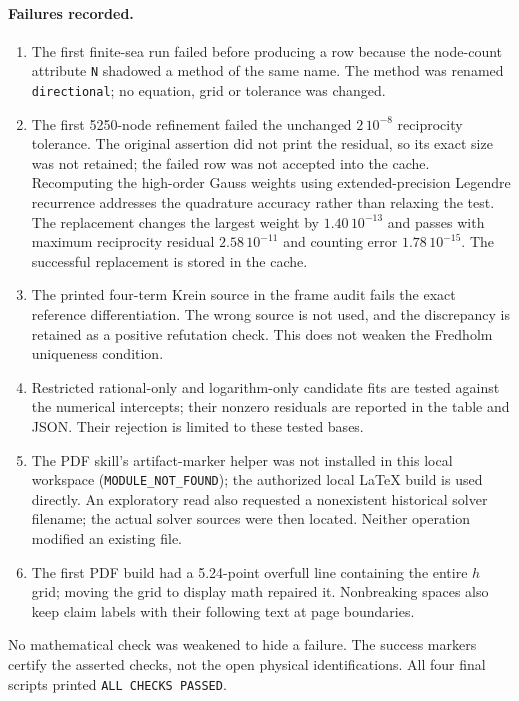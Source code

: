 \documentclass[11pt,a4paper]{article}
\begin{document}
\paragraph{Failures recorded.}
\begin{enumerate}
\item The first finite-sea run failed before producing a row because the
node-count attribute \texttt{N} shadowed a method of the same name.
The method was renamed \texttt{directional}; no equation, grid or tolerance
was changed.
\item The first 5250-node refinement failed the unchanged $2\,10^{-8}$
reciprocity tolerance. The original assertion did not print the residual,
so its exact size was not retained; the failed row was not accepted into
the cache. Recomputing the high-order Gauss weights using extended-precision
Legendre recurrence addresses the quadrature accuracy rather than relaxing
the test. The replacement changes the largest weight by $1.40\,10^{-13}$
and passes with maximum reciprocity residual $2.58\,10^{-11}$ and counting
error $1.78\,10^{-15}$. The successful replacement is stored in the cache.
\item The printed four-term Krein source in the frame audit fails the exact
reference differentiation. The wrong source is not used, and the discrepancy
is retained as a positive refutation check. This does not weaken the
Fredholm uniqueness condition.
\item Restricted rational-only and logarithm-only candidate fits are tested
against the numerical intercepts; their nonzero residuals are reported in
the table and JSON. Their rejection is limited to these tested bases.
\item The PDF skill's artifact-marker helper was not installed in this local
workspace (\texttt{MODULE\_NOT\_FOUND}); the authorized local LaTeX build
is used directly. An exploratory read also requested a nonexistent historical
solver filename; the actual solver sources were then located. Neither
operation modified an existing file.
\item The first PDF build had a 5.24-point overfull line containing the
entire $h$ grid; moving the grid to display math repaired it. Nonbreaking
spaces also keep claim labels with their following text at page boundaries.
\end{enumerate}
No mathematical check was weakened to hide a failure. The success markers
certify the asserted checks, not the open physical identifications.
All four final scripts printed \texttt{ALL CHECKS PASSED}.
\end{document}
